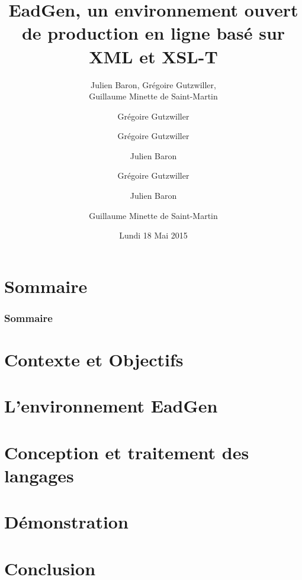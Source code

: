 \documentclass[11pt, handout]{beamer}
\title[EadGen]{EadGen, un environnement ouvert de production en ligne basé sur 
XML et XSL-T}
\author{Julien Baron, Grégoire Gutzwiller, \\ Guillaume Minette de Saint-Martin}
\date[18/05/2015]{Lundi 18 Mai 2015}
\begin{document}
\begin{frame}[plain]
	\maketitle
\end{frame}

\author{Grégoire Gutzwiller}
\section*{Sommaire}
\begin{frame}
	\frametitle{Sommaire}
	\tableofcontents
\end{frame}

\author{Grégoire Gutzwiller}
\section{Contexte et Objectifs}


\author{Julien Baron}
\section{L'environnement EadGen}


\author{Grégoire Gutzwiller}
\section{Conception et traitement des langages}


\author{Julien Baron}
\section{Démonstration}


\author{Guillaume Minette de Saint-Martin}
\section{Conclusion}

\end{document}
